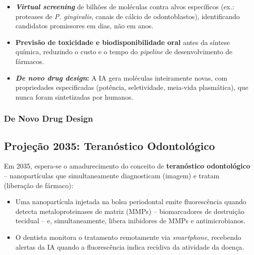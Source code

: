 \begin{itemize}
  \item \textbf{\textit{Virtual screening}} de bilhões de moléculas contra alvos
    específicos (ex.: proteases de \textit{P. gingivalis}, canais de cálcio de
    odontoblastos), identificando candidatos promissores em dias, não em anos.

  \item \textbf{Previsão de toxicidade e biodisponibilidade oral} antes da
    síntese química, reduzindo o custo e o tempo do \textit{pipeline} de
    desenvolvimento de fármacos.

  \item \textbf{\textit{De novo drug design}:} A IA gera moléculas inteiramente
    novas, com propriedades especificadas (potência, seletividade, meia-vida
    plasmática), que nunca foram sintetizadas por humanos.
\end{itemize}

\subsubsection{De Novo Drug Design}


\subsection{Projeção 2035: Teranóstico Odontológico}

Em 2035, espera-se o amadurecimento do conceito de \textbf{teranóstico
odontológico} -- nanopartículas que simultaneamente diagnosticam (imagem) e
tratam (liberação de fármaco):

\begin{itemize}
  \item Uma nanopartícula injetada na bolsa periodontal emite fluorescência
    quando detecta metaloproteinases de matriz (MMPs) -- biomarcadores de
    destruição tecidual -- e, simultaneamente, libera inibidores de MMPs e
    antimicrobianos.
  \item O dentista monitora o tratamento remotamente via \textit{smartphone},
    recebendo alertas da IA quando a fluorescência indica recidiva da atividade
    da doença.
\end{itemize}

